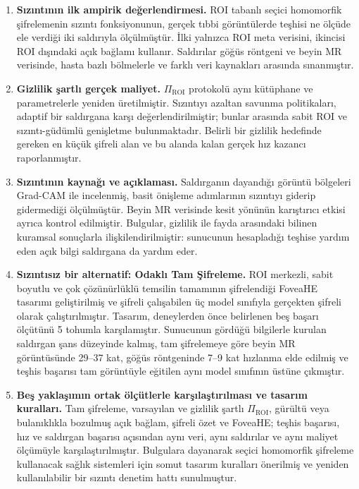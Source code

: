 \begin{enumerate}
\item \textbf{Sızıntının ilk ampirik değerlendirmesi.} ROI tabanlı seçici homomorfik şifrelemenin sızıntı fonksiyonunun, gerçek tıbbi görüntülerde teşhisi ne ölçüde ele verdiği iki saldırıyla ölçülmüştür. İlki yalnızca ROI meta verisini, ikincisi ROI dışındaki açık bağlamı kullanır. Saldırılar göğüs röntgeni ve beyin MR verisinde, hasta bazlı bölmelerle ve farklı veri kaynakları arasında sınanmıştır.
\item \textbf{Gizlilik şartlı gerçek maliyet.} $\Pi_{\mathrm{ROI}}$ protokolü aynı kütüphane ve parametrelerle yeniden üretilmiştir. Sızıntıyı azaltan savunma politikaları, adaptif bir saldırgana karşı değerlendirilmiştir; bunlar arasında sabit ROI ve sızıntı-güdümlü genişletme bulunmaktadır. Belirli bir gizlilik hedefinde gereken en küçük şifreli alan ve bu alanda kalan gerçek hız kazancı raporlanmıştır.
\item \textbf{Sızıntının kaynağı ve açıklaması.} Saldırganın dayandığı görüntü bölgeleri Grad-CAM ile incelenmiş, basit önişleme adımlarının sızıntıyı giderip gidermediği ölçülmüştür. Beyin MR verisinde kesit yönünün karıştırıcı etkisi ayrıca kontrol edilmiştir. Bulgular, gizlilik ile fayda arasındaki bilinen kuramsal sonuçlarla ilişkilendirilmiştir: sunucunun hesapladığı teşhise yardım eden açık bilgi saldırgana da yardım eder.
\item \textbf{Sızıntısız bir alternatif: Odaklı Tam Şifreleme.} ROI merkezli, sabit boyutlu ve çok çözünürlüklü temsilin tamamının şifrelendiği FoveaHE tasarımı geliştirilmiş ve şifreli çalışabilen üç model sınıfıyla gerçekten şifreli olarak çalıştırılmıştır. Tasarım, deneylerden önce belirlenen beş başarı ölçütünü 5 tohumla karşılamıştır. Sunucunun gördüğü bilgilerle kurulan saldırgan şans düzeyinde kalmış, tam şifrelemeye göre beyin MR görüntüsünde 29--37 kat, göğüs röntgeninde 7--9 kat hızlanma elde edilmiş ve teşhis başarısı tam görüntüyle eğitilen aynı model sınıfının üstüne çıkmıştır.
\item \textbf{Beş yaklaşımın ortak ölçütlerle karşılaştırılması ve tasarım kuralları.} Tam şifreleme, varsayılan ve gizlilik şartlı $\Pi_{\mathrm{ROI}}$, gürültü veya bulanıklıkla bozulmuş açık bağlam, şifreli özet ve FoveaHE; teşhis başarısı, hız ve saldırgan başarısı açısından aynı veri, aynı saldırılar ve aynı maliyet ölçümüyle karşılaştırılmıştır. Bulgulara dayanarak seçici homomorfik şifreleme kullanacak sağlık sistemleri için somut tasarım kuralları önerilmiş ve yeniden kullanılabilir bir sızıntı denetim hattı sunulmuştur.
\end{enumerate}

